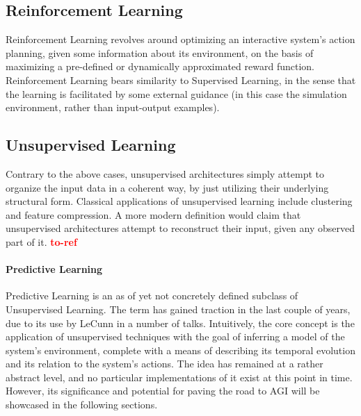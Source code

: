 \documentclass[]{article}
\newcommand\toref{\textcolor{red}{\bf{to-ref}}}
\begin{document}
\subsection{Reinforcement Learning}
Reinforcement Learning revolves around optimizing an interactive system's action planning, given some information about its environment, on the basis of maximizing a pre-defined or dynamically approximated reward function. Reinforcement Learning bears similarity to Supervised Learning, in the sense that the learning is facilitated by some external guidance (in this case the simulation environment, rather than input-output examples).

\subsection{Unsupervised Learning}
Contrary to the above cases, unsupervised architectures simply attempt to organize the input data in a coherent way, by just utilizing their underlying structural form. Classical applications of unsupervised learning include clustering and feature compression. A more modern definition would claim that unsupervised architectures attempt to reconstruct their input, given any observed part of it. {\toref{}}

\paragraph{Predictive Learning}
Predictive Learning is an as of yet not concretely defined subclass of Unsupervised Learning. The term has gained traction in the last couple of years, due to its use by LeCunn in a number of talks. Intuitively, the core concept is the application of unsupervised techniques with the goal of inferring a model of the system's environment, complete with a means of describing its temporal evolution and its relation to the system's actions. The idea has remained at a rather abstract level, and no particular implementations of it exist at this point in time. However, its significance and potential for paving the road to AGI will be showcased in the following sections.



\end{document}
